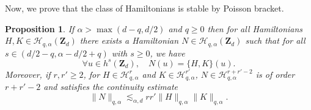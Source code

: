 \documentclass[JEP,XML,SOM,Unicode,NoEqCountersInSection,published]{cedram}
\newtheorem{proposition}[theorem]{Proposition}
\theoremstyle{definition}
\begin{document}
Now, we prove that the class of Hamiltonians is stable by Poisson bracket.
\begin{proposition}
\label{prop_stable_Poisson}
If $\alpha>\max(d-q,d/2)$ and $q\geq 0$ then for all Hamiltonians $H,K \in \mathscr{H}_{q,\alpha}(\mathbf{Z}_d)$ there exists a Hamiltonian $N \in \mathscr{H}_{q,\alpha}(\mathbf{Z}_d)$ such that for all $s\in (d/2-q, \alpha-d/2+q)$ with $s\geq 0$, we have
\[
\forall u \in h^s(\mathbf{Z}_d), \quad N(u) = \{ H,K\}(u).
\]
Moreover, if $r,r'\geq 2$, for $H\in \mathscr{H}_{q,\alpha}^r$ and $K\in \mathscr{H}_{q,\alpha}^{r'}$, $N \in \mathscr{H}_{q,\alpha}^{r+r'-2}$ is of order $r+r'-2$ and satisfies the continuity estimate
\begin{equation}
\label{eq_cont_est_Poisson}
\| N\|_{q,\alpha} \lesssim_{\alpha,d} r r' \| H \|_{q,\alpha} \| K \|_{q,\alpha}.
\end{equation}
\end{proposition}
\end{document}
